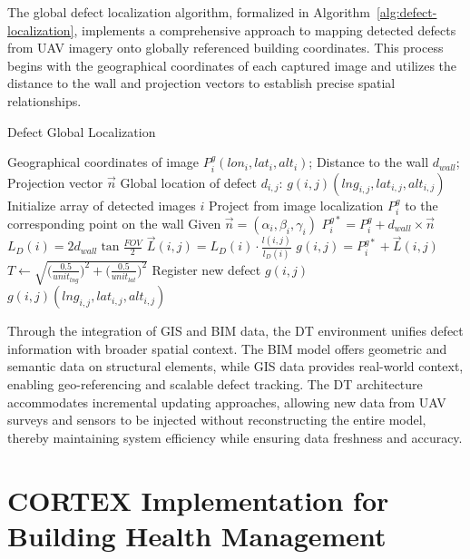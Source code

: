 The global defect localization algorithm, formalized in Algorithm~\ref{alg:defect-localization}, implements a comprehensive approach to mapping detected defects from UAV imagery onto globally referenced building coordinates. This process begins with the geographical coordinates of each captured image and utilizes the distance to the wall and projection vectors to establish precise spatial relationships.

\begin{algorithm}[htbp]
\caption{Defect Global Localization}
\label{alg:defect-localization}
\begin{algorithmic}[1]
\REQUIRE Geographical coordinates of image $P_{i}^{g}(lon_{i}, lat_{i}, alt_{i})$; Distance to the wall $d_{wall}$; Projection vector $\vec{n}$
\ENSURE Global location of defect $d_{i,j}$: $g(i,j)(lng_{i,j}, lat_{i,j}, alt_{i,j})$
\STATE Initialize array of detected images $i$
    \STATE Project from image localization $P_{i}^{g}$ to the corresponding point on the wall
    \STATE Given $\vec{n} = (\alpha_{i}, \beta_{i}, \gamma_{i})$
    \STATE $P^{g\ast}_{i} = P^{g}_{i} + d_{wall} \times \vec{n}$
        \STATE $L_{D}(i) = 2d_{wall} \tan{\frac{FOV}{2}}$
        \STATE $\vec{L}(i,j) = L_{D}(i) \cdot \frac{l(i,j)}{l_{D}(i)}$
        \STATE $g(i,j) = P^{g\ast}_{i} + \vec{L}(i,j)$
        \STATE $T \gets \sqrt{ \bigl(\frac{0.5}{unit_{lng}}\bigr)^2 + \bigl(\frac{0.5}{unit_{lat}}\bigr)^2 }$
                    \STATE Register new defect $g(i,j)$
                \ENDIF
            \ENDFOR
        \ENDFOR
    \ENDFOR
\ENDFOR
\RETURN $g(i,j)(lng_{i,j}, lat_{i,j}, alt_{i,j})$
\end{algorithmic}
\end{algorithm}

Through the integration of GIS and BIM data, the DT environment unifies defect information with broader spatial context. The BIM model offers geometric and semantic data on structural elements, while GIS data provides real-world context, enabling geo-referencing and scalable defect tracking. The DT architecture accommodates incremental updating approaches, allowing new data from UAV surveys and sensors to be injected without reconstructing the entire model, thereby maintaining system efficiency while ensuring data freshness and accuracy.

\section{CORTEX Implementation for Building Health Management}


